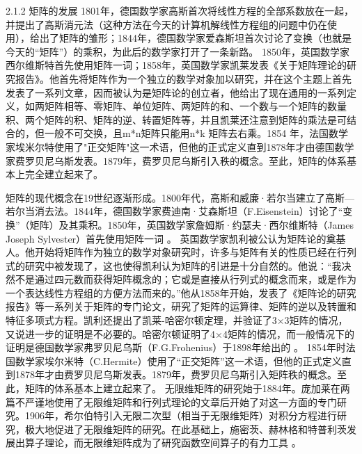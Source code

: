 {2.1.2 矩阵的发展}
	1801年，德国数学家高斯首次将线性方程的全部系数放在一起，并提出了高斯消元法（这种方法在今天的计算机解线性方程组的问题中仍在使用），给出了矩阵的雏形；1844年，德国数学家爱森斯坦首次讨论了变换（也就是今天的“矩阵”）的乘积，为此后的数学家打开了一条新路。
1850年，英国数学家西尔维斯特首先使用矩阵一词；1858年，英国数学家凯莱发表《关于矩阵理论的研究报告》。他首先将矩阵作为一个独立的数学对象加以研究，并在这个主题上首先发表了一系列文章，因而被认为是矩阵论的创立者，他给出了现在通用的一系列定义，如两矩阵相等、零矩阵、单位矩阵、两矩阵的和、一个数与一个矩阵的数量积、两个矩阵的积、矩阵的逆、转置矩阵等，并且凯莱还注意到矩阵的乘法是可结合的，但一般不可交换，且m*n矩阵只能用n*k 矩阵去右乘。1854 年，法国数学家埃米尔特使用了"正交矩阵"这一术语，但他的正式定义直到1878年才由德国数学家费罗贝尼乌斯发表。1879年，费罗贝尼乌斯引入秩的概念。至此，矩阵的体系基本上完全建立起来了。


      矩阵的现代概念在19世纪逐渐形成。1800年代，高斯和威廉·若尔当建立了高斯—若尔当消去法。1844年，德国数学家费迪南·艾森斯坦（F.Eisenstein）讨论了“变换”（矩阵）及其乘积。1850年，英国数学家詹姆斯·约瑟夫·西尔维斯特（James Joseph Sylvester）首先使用矩阵一词 。
英国数学家凯利被公认为矩阵论的奠基人。他开始将矩阵作为独立的数学对象研究时，许多与矩阵有关的性质已经在行列式的研究中被发现了，这也使得凯利认为矩阵的引进是十分自然的。他说：“我决然不是通过四元数而获得矩阵概念的；它或是直接从行列式的概念而来，或是作为一个表达线性方程组的方便方法而来的。”他从1858年开始，发表了《矩阵论的研究报告》等一系列关于矩阵的专门论文，研究了矩阵的运算律、矩阵的逆以及转置和特征多项式方程。凯利还提出了凯莱-哈密尔顿定理，并验证了3×3矩阵的情况，又说进一步的证明是不必要的。哈密尔顿证明了4×4矩阵的情况，而一般情况下的证明是德国数学家弗罗贝尼乌斯（F.G.Frohenius）于1898年给出的 。
1854年时法国数学家埃尔米特（C.Hermite）使用了“正交矩阵”这一术语，但他的正式定义直到1878年才由费罗贝尼乌斯发表。1879年，费罗贝尼乌斯引入矩阵秩的概念。至此，矩阵的体系基本上建立起来了。
    无限维矩阵的研究始于1884年。庞加莱在两篇不严谨地使用了无限维矩阵和行列式理论的文章后开始了对这一方面的专门研究。1906年，希尔伯特引入无限二次型（相当于无限维矩阵）对积分方程进行研究，极大地促进了无限维矩阵的研究。在此基础上，施密茨、赫林格和特普利茨发展出算子理论，而无限维矩阵成为了研究函数空间算子的有力工具 。


